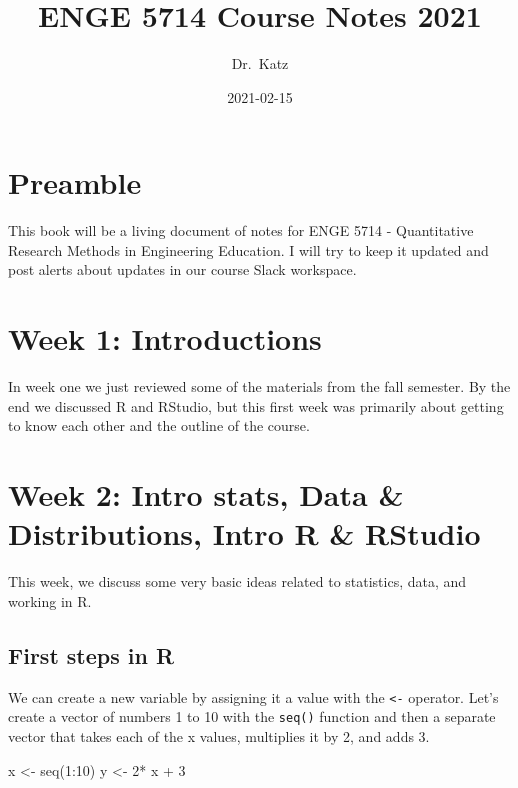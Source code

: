 \documentclass[
]{book}
\title{ENGE 5714 Course Notes 2021}
\author{Dr.~Katz}
\date{2021-02-15}
\newenvironment{Shaded}{\begin{snugshade}}{\end{snugshade}}
\newcommand{\DecValTok}[1]{\textcolor[rgb]{0.00,0.00,0.81}{#1}}
\newcommand{\FunctionTok}[1]{\textcolor[rgb]{0.00,0.00,0.00}{#1}}
\newcommand{\NormalTok}[1]{#1}
\newcommand{\OtherTok}[1]{\textcolor[rgb]{0.56,0.35,0.01}{#1}}
\newcommand{\SpecialCharTok}[1]{\textcolor[rgb]{0.00,0.00,0.00}{#1}}
\begin{document}
\maketitle

{
\setcounter{tocdepth}{1}
\tableofcontents
}
\hypertarget{preamble}{%
\chapter*{Preamble}\label{preamble}}

This book will be a living document of notes for ENGE 5714 - Quantitative Research Methods in Engineering Education. I will try to keep it updated and post alerts about updates in our course Slack workspace.

\hypertarget{week-1-introductions}{%
\chapter{Week 1: Introductions}\label{week-1-introductions}}

In week one we just reviewed some of the materials from the fall semester. By the end we discussed R and RStudio, but this first week was primarily about getting to know each other and the outline of the course.

\hypertarget{week-2-intro-stats-data-distributions-intro-r-rstudio}{%
\chapter{Week 2: Intro stats, Data \& Distributions, Intro R \& RStudio}\label{week-2-intro-stats-data-distributions-intro-r-rstudio}}

This week, we discuss some very basic ideas related to statistics, data, and working in R.

\hypertarget{first-steps-in-r}{%
\section{First steps in R}\label{first-steps-in-r}}

We can create a new variable by assigning it a value with the \texttt{\textless{}-} operator. Let's create a vector of numbers 1 to 10 with the \texttt{seq()} function and then a separate vector that takes each of the x values, multiplies it by 2, and adds 3.

\begin{Shaded}
\begin{Highlighting}[]
\NormalTok{x }\OtherTok{\textless{}{-}} \FunctionTok{seq}\NormalTok{(}\DecValTok{1}\SpecialCharTok{:}\DecValTok{10}\NormalTok{)}
\NormalTok{y }\OtherTok{\textless{}{-}} \DecValTok{2}\SpecialCharTok{*}\NormalTok{ x }\SpecialCharTok{+} \DecValTok{3}
\end{Highlighting}
\end{Shaded}
\end{document}

